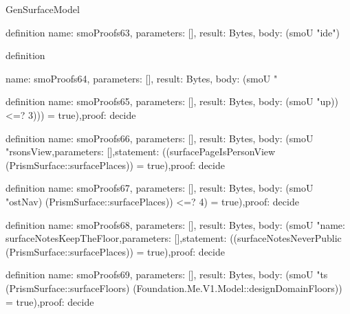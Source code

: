 \begin{lexlean}{GenSurfaceModel}
\begin{semanticmodule}
{definition{
  name: smoProofs63,
  parameters: [],
  result: Bytes,
  body: (smoU "ide{}\n}\n{}\n")
}

definition{
  name: smoProofs64,
  parameters: [],
  result: Bytes,
  body: (smoU "

definition{
  name: smoProofs65,
  parameters: [],
  result: Bytes,
  body: (smoU "up)) <=? 3))) = true),\n  proof: decide{}\n}\n{}\n{}

definition{
  name: smoProofs66,
  parameters: [],
  result: Bytes,
  body: (smoU "rsonsView,\n  parameters: [],\n  statement: ((surfacePageIsPersonView (PrismSurface::surfacePlaces)) = true),\n  proof: decide{}\n}\n{}

definition{
  name: smoProofs67,
  parameters: [],
  result: Bytes,
  body: (smoU "ostNav) (PrismSurface::surfacePlaces)) <=? 4) = true),\n  proof: decide{}\n}\n{}\n{}

definition{
  name: smoProofs68,
  parameters: [],
  result: Bytes,
  body: (smoU "name: surfaceNotesKeepTheFloor,\n  parameters: [],\n  statement: ((surfaceNotesNeverPublic (PrismSurface::surfacePlaces)) = true),\n  proof: decide{}\n}\n{}

definition{
  name: smoProofs69,
  parameters: [],
  result: Bytes,
  body: (smoU "ts (PrismSurface::surfaceFloors) (Foundation.Me.V1.Model::designDomainFloors)) = true),\n  proof: decide{}\n}\n{}

}
\end{semanticmodule}
\end{lexlean}
